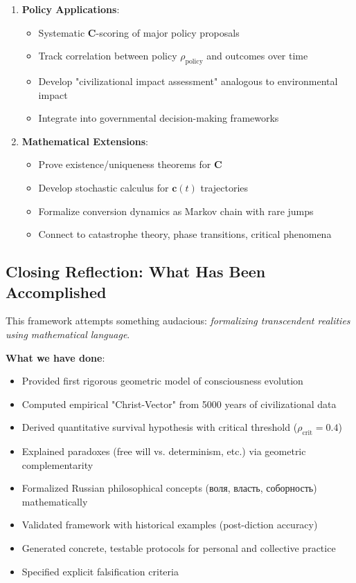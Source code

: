 \documentclass[11pt,a4paper]{article}
\theoremstyle{definition}
\theoremstyle{remark}
\newcommand{\cc}{\mathbf{c}}
\begin{document}
\begin{enumerate}
\begin{enumerate}[leftmargin=*]
\item \textbf{Policy Applications}:
    \begin{itemize}
        \item Systematic \(\mathbf{C}\)-scoring of major policy proposals
        \item Track correlation between policy \(\rho_{\text{policy}}\) and outcomes over time
        \item Develop "civilizational impact assessment" analogous to environmental impact
        \item Integrate into governmental decision-making frameworks
    \end{itemize}

\item \textbf{Mathematical Extensions}:
    \begin{itemize}
        \item Prove existence/uniqueness theorems for \(\mathbf{C}\)
        \item Develop stochastic calculus for \(\cc(t)\) trajectories
        \item Formalize conversion dynamics as Markov chain with rare jumps
        \item Connect to catastrophe theory, phase transitions, critical phenomena
    \end{itemize}
\end{enumerate}

\subsection{Closing Reflection: What Has Been Accomplished}

This framework attempts something audacious: \textit{formalizing transcendent realities using mathematical language}.

\textbf{What we have done}:
\begin{itemize}
    \item Provided first rigorous geometric model of consciousness evolution
    \item Computed empirical "Christ-Vector" from 5000 years of civilizational data
    \item Derived quantitative survival hypothesis with critical threshold (\(\rho_{\text{crit}} = 0.4\))
    \item Explained paradoxes (free will vs. determinism, etc.) via geometric complementarity
    \item Formalized Russian philosophical concepts (воля, власть, соборность) mathematically
    \item Validated framework with historical examples (post-diction accuracy)
    \item Generated concrete, testable protocols for personal and collective practice
    \item Specified explicit falsification criteria
\end{itemize}


\end{enumerate}
\end{document}
